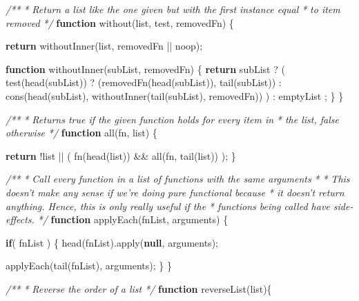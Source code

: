 \documentclass[12pt, ]{article}
\newenvironment{Shaded}{}{}
\newcommand{\KeywordTok}[1]{\textcolor[rgb]{0.00,0.44,0.13}{\textbf{{#1}}}}
\newcommand{\CommentTok}[1]{\textcolor[rgb]{0.38,0.63,0.69}{\textit{{#1}}}}
\newcommand{\FunctionTok}[1]{\textcolor[rgb]{0.02,0.16,0.49}{{#1}}}
\newcommand{\NormalTok}[1]{{#1}}
\begin{document}
\begin{Shaded}
\begin{Highlighting}[]
\CommentTok{/**}
\CommentTok{ * Return a list like the one given but with the first instance equal }
\CommentTok{ * to item removed }
\CommentTok{ */}
\KeywordTok{function} \FunctionTok{without}\NormalTok{(list, test, removedFn) \{}
 
   \KeywordTok{return} \FunctionTok{withoutInner}\NormalTok{(list, removedFn || noop);}
 
   \KeywordTok{function} \FunctionTok{withoutInner}\NormalTok{(subList, removedFn) \{}
      \KeywordTok{return} \NormalTok{subList  }
         \NormalTok{?  ( }\FunctionTok{test}\NormalTok{(}\FunctionTok{head}\NormalTok{(subList)) }
                  \NormalTok{? (}\FunctionTok{removedFn}\NormalTok{(}\FunctionTok{head}\NormalTok{(subList)), }\FunctionTok{tail}\NormalTok{(subList)) }
                  \NormalTok{: }\FunctionTok{cons}\NormalTok{(}\FunctionTok{head}\NormalTok{(subList), }\FunctionTok{withoutInner}\NormalTok{(}\FunctionTok{tail}\NormalTok{(subList), removedFn))}
            \NormalTok{)}
         \NormalTok{: emptyList}
         \NormalTok{;}
   \NormalTok{\}               }
\NormalTok{\}}

\CommentTok{/** }
\CommentTok{ * Returns true if the given function holds for every item in }
\CommentTok{ * the list, false otherwise }
\CommentTok{ */}
\KeywordTok{function} \FunctionTok{all}\NormalTok{(fn, list) \{}
   
   \KeywordTok{return} \NormalTok{!list || }
          \NormalTok{( }\FunctionTok{fn}\NormalTok{(}\FunctionTok{head}\NormalTok{(list)) && }\FunctionTok{all}\NormalTok{(fn, }\FunctionTok{tail}\NormalTok{(list)) );}
\NormalTok{\}}

\CommentTok{/**}
\CommentTok{ * Call every function in a list of functions with the same arguments}
\CommentTok{ * }
\CommentTok{ * This doesn't make any sense if we're doing pure functional because }
\CommentTok{ * it doesn't return anything. Hence, this is only really useful if the}
\CommentTok{ * functions being called have side-effects. }
\CommentTok{ */}
\KeywordTok{function} \FunctionTok{applyEach}\NormalTok{(fnList, arguments) \{}

   \KeywordTok{if}\NormalTok{( fnList ) \{  }
      \FunctionTok{head}\NormalTok{(fnList).}\FunctionTok{apply}\NormalTok{(}\KeywordTok{null}\NormalTok{, arguments);}
      
      \FunctionTok{applyEach}\NormalTok{(}\FunctionTok{tail}\NormalTok{(fnList), arguments);}
   \NormalTok{\}}
\NormalTok{\}}

\CommentTok{/**}
\CommentTok{ * Reverse the order of a list}
\CommentTok{ */}
\KeywordTok{function} \FunctionTok{reverseList}\NormalTok{(list)\{ }


\end{Highlighting}
\end{Shaded}
\end{document}
